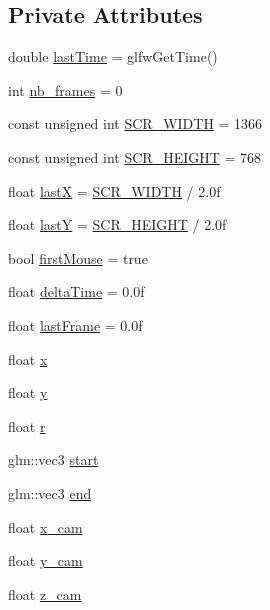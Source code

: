 \subsection*{Private Attributes}
\begin{DoxyCompactItemize}
\item 
double \hyperlink{classGame_ace2a5d0114bae5d7aed5019fb7594a74}{last\+Time} = glfw\+Get\+Time()
\item 
int \hyperlink{classGame_a63d5638d248bf98c40198a993acb7116}{nb\+\_\+frames} = 0
\item 
const unsigned int \hyperlink{classGame_ad2b1545413788030fd7e6188997f6f2e}{S\+C\+R\+\_\+\+W\+I\+D\+TH} = 1366
\item 
const unsigned int \hyperlink{classGame_a2c6e67480b144efbf5658a383dc59be6}{S\+C\+R\+\_\+\+H\+E\+I\+G\+HT} = 768
\item 
float \hyperlink{classGame_a842246f215e74d4bddcf3240023e9a69}{lastX} = \hyperlink{classGame_ad2b1545413788030fd7e6188997f6f2e}{S\+C\+R\+\_\+\+W\+I\+D\+TH} / 2.\+0f
\item 
float \hyperlink{classGame_a3d6e621544e978b995d29c23cce7b6ea}{lastY} = \hyperlink{classGame_a2c6e67480b144efbf5658a383dc59be6}{S\+C\+R\+\_\+\+H\+E\+I\+G\+HT} / 2.\+0f
\item 
bool \hyperlink{classGame_a30f99ca78c46117cea01501ef90fadd2}{first\+Mouse} = true
\item 
float \hyperlink{classGame_ad918e31c1644966465f822d912585f16}{delta\+Time} = 0.\+0f
\item 
float \hyperlink{classGame_a4001497330fe92f315d40cb1de2961ee}{last\+Frame} = 0.\+0f
\item 
float \hyperlink{classGame_aaf300d683d6896112e2e901b1024b172}{x}
\item 
float \hyperlink{classGame_a221bbe2ebb32e5ead7d84c6ed08bcbde}{y}
\item 
float \hyperlink{classGame_aafae5c26f5ffa6304824b102ddfedbc8}{r}
\item 
glm\+::vec3 \hyperlink{classGame_a3340408b0b220ba2fa7c21cc024be4ce}{start}
\item 
glm\+::vec3 \hyperlink{classGame_a241457bcabfa070bd4371f7cc20d4ed6}{end}
\item 
float \hyperlink{classGame_afef07f52dd1878b9d0b8aa1b30dbbad8}{x\+\_\+cam}
\item 
float \hyperlink{classGame_a40506d4bac4f3054bbc0ec46963d1405}{y\+\_\+cam}
\item 
float \hyperlink{classGame_a53313ed59bd68bd173dc09b91e982924}{z\+\_\+cam}

\end{DoxyCompactItemize}
